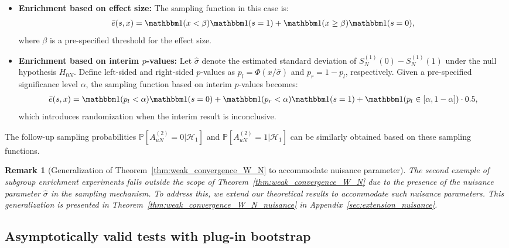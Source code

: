 \documentclass[12pt]{article}
\newtheorem{remark}{Remark}
\def\P{\mathbb{P}}
\def\P{\mathbb{P}}
\renewcommand{\P}{\mathbb{P}}							%
\newcommand{\indicator}{\mathbbm 1}						%
\begin{document}
\begin{itemize}
    \item \textbf{Enrichment based on effect size:}  
    The sampling function in this case is:
    \begin{align*}
        \bar e(s, x) = \indicator(x < \beta)\indicator(s = 1) + \indicator(x \geq \beta)\indicator(s = 0),
    \end{align*}
    where $\beta$ is a pre-specified threshold for the effect size.

    \item \textbf{Enrichment based on interim $p$-values:}  
    Let $\hat{\sigma}$ denote the estimated standard deviation of $S_N^{(1)}(0) - S_N^{(1)}(1)$ under the null hypothesis $H_{0N}$. Define left-sided and right-sided $p$-values as $p_l = \Phi(x / \hat{\sigma})$ and $p_r = 1 - p_l$, respectively. Given a pre-specified significance level $\alpha$, the sampling function based on interim $p$-values becomes:
    \begin{align*}
        \bar e(s, x) = \indicator(p_l < \alpha)\indicator(s = 0) + \indicator(p_r < \alpha)\indicator(s = 1) + \indicator(p_l \in [\alpha, 1 - \alpha]) \cdot 0.5,
    \end{align*}
    which introduces randomization when the interim result is inconclusive.
\end{itemize}
The follow-up sampling probabilities $\P[A_{uN}^{(2)} = 0|\mathcal{H}_{1}]$ and $\P[A_{uN}^{(2)} = 1|\mathcal{H}_{1}]$ can be similarly obtained based on these sampling functions.

\begin{remark}[Generalization of Theorem~\ref{thm:weak_convergence_W_N} to accommodate nuisance parameter]
	
	The second example of subgroup enrichment experiments falls outside the scope of Theorem~\ref{thm:weak_convergence_W_N} due to the presence of the nuisance parameter $\hat\sigma$ in the sampling mechanism. To address this, we extend our theoretical results to accommodate such nuisance parameters. This generalization is presented in Theorem~\ref{thm:weak_convergence_W_N_nuisance} in Appendix~\ref{sec:extension_nuisance}.
\end{remark}


\subsection{Asymptotically valid tests with plug-in bootstrap}\label{sec:bootstrap_procedure}
\end{document}
